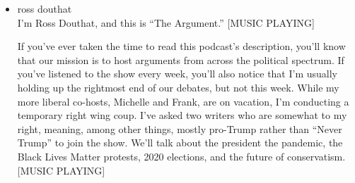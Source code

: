 \begin{itemize}
\item
  ross douthat\\
  I'm Ross Douthat, and this is ``The Argument.'' {[}MUSIC PLAYING{]}

  If you've ever taken the time to read this podcast's description,
  you'll know that our mission is to host arguments from across the
  political spectrum. If you've listened to the show every week, you'll
  also notice that I'm usually holding up the rightmost end of our
  debates, but not this week. While my more liberal co-hosts, Michelle
  and Frank, are on vacation, I'm conducting a temporary right wing
  coup. I've asked two writers who are somewhat to my right, meaning,
  among other things, mostly pro-Trump rather than ``Never Trump'' to
  join the show. We'll talk about the president the pandemic, the Black
  Lives Matter protests, 2020 elections, and the future of conservatism.
  {[}MUSIC PLAYING{]}


\end{itemize}
